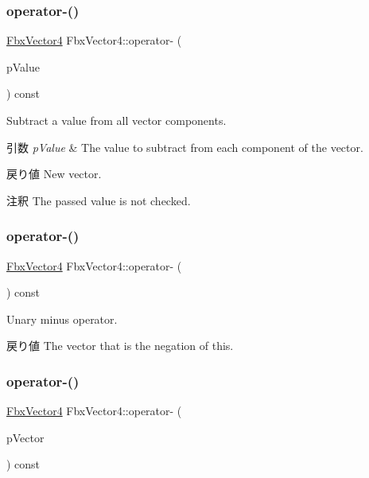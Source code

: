 \subsubsection{\texorpdfstring{operator-\/()}{operator-()}\hspace{0.1cm}{\footnotesize\ttfamily [1/3]}}
{\footnotesize\ttfamily \hyperlink{class_fbx_vector4}{Fbx\+Vector4} Fbx\+Vector4\+::operator-\/ (\begin{DoxyParamCaption}\item[{double}]{p\+Value }\end{DoxyParamCaption}) const}

Subtract a value from all vector components. 
\begin{DoxyParams}{引数}
{\em p\+Value} & The value to subtract from each component of the vector. \\
\hline
\end{DoxyParams}
\begin{DoxyReturn}{戻り値}
New vector. 
\end{DoxyReturn}
\begin{DoxyRemark}{注釈}
The passed value is not checked. 
\end{DoxyRemark}
\mbox{\label{class_fbx_vector4_aee704c3c0622de74004355ff999c934b}} 
\subsubsection{\texorpdfstring{operator-\/()}{operator-()}\hspace{0.1cm}{\footnotesize\ttfamily [2/3]}}
{\footnotesize\ttfamily \hyperlink{class_fbx_vector4}{Fbx\+Vector4} Fbx\+Vector4\+::operator-\/ (\begin{DoxyParamCaption}{ }\end{DoxyParamCaption}) const}

Unary minus operator. \begin{DoxyReturn}{戻り値}
The vector that is the negation of {\ttfamily this}. 
\end{DoxyReturn}
\mbox{\label{class_fbx_vector4_a5c49b63dc74031c9c977fb94c9bd5fd8}} 
\subsubsection{\texorpdfstring{operator-\/()}{operator-()}\hspace{0.1cm}{\footnotesize\ttfamily [3/3]}}
{\footnotesize\ttfamily \hyperlink{class_fbx_vector4}{Fbx\+Vector4} Fbx\+Vector4\+::operator-\/ (\begin{DoxyParamCaption}\item[{const \hyperlink{class_fbx_vector4}{Fbx\+Vector4} \&}]{p\+Vector }\end{DoxyParamCaption}) const}

